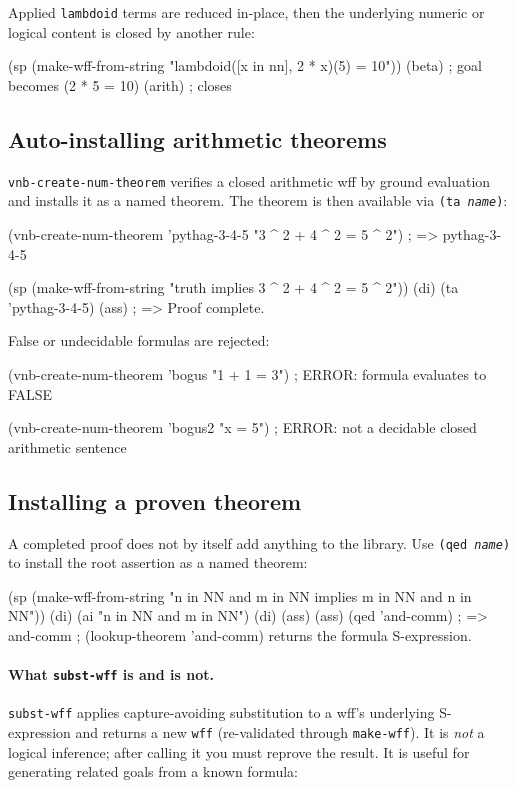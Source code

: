 Applied \texttt{lambdoid} terms are reduced
in-place, then the underlying numeric or logical content is closed
by another rule:

\begin{VNBcode}
(sp (make-wff-from-string "lambdoid([x in nn], 2 * x)(5) = 10"))
(beta)   ; goal becomes (2 * 5 = 10)
(arith)  ; closes
\end{VNBcode}

\subsection{Auto-installing arithmetic theorems}

\texttt{vnb-create-num-theorem} verifies a closed arithmetic wff by
ground evaluation and installs it as a named theorem.  The theorem is
then available via \texttt{(ta \textit{name})}:

\begin{VNBcode}
(vnb-create-num-theorem 'pythag-3-4-5 "3 ^ 2 + 4 ^ 2 = 5 ^ 2")
; => pythag-3-4-5

(sp (make-wff-from-string "truth implies 3 ^ 2 + 4 ^ 2 = 5 ^ 2"))
(di) (ta 'pythag-3-4-5) (ass)
; => Proof complete.
\end{VNBcode}

False or undecidable formulas are rejected:

\begin{VNBcode}
(vnb-create-num-theorem 'bogus "1 + 1 = 3")
; ERROR: formula evaluates to FALSE

(vnb-create-num-theorem 'bogus2 "x = 5")
; ERROR: not a decidable closed arithmetic sentence
\end{VNBcode}

\subsection{Installing a proven theorem}
\label{sec:qed-and-subst}

A completed proof does not by itself add anything to the library.  Use
\texttt{(qed \textit{name})} to install the root assertion as a named
theorem:

\begin{VNBcode}
(sp (make-wff-from-string "n in NN and m in NN implies m in NN and n in NN"))
(di) (ai "n in NN and m in NN") (di) (ass) (ass)
(qed 'and-comm)
; => and-comm
; (lookup-theorem 'and-comm) returns the formula S-expression.
\end{VNBcode}

\paragraph{What \texttt{subst-wff} is and is not.}
\texttt{subst-wff} applies capture-avoiding substitution to a wff's
underlying S-expression and returns a new \texttt{wff} (re-validated
through \texttt{make-wff}).  It is \emph{not} a logical inference;
after calling it you must reprove the result.  It is useful for
generating related goals from a known formula:

